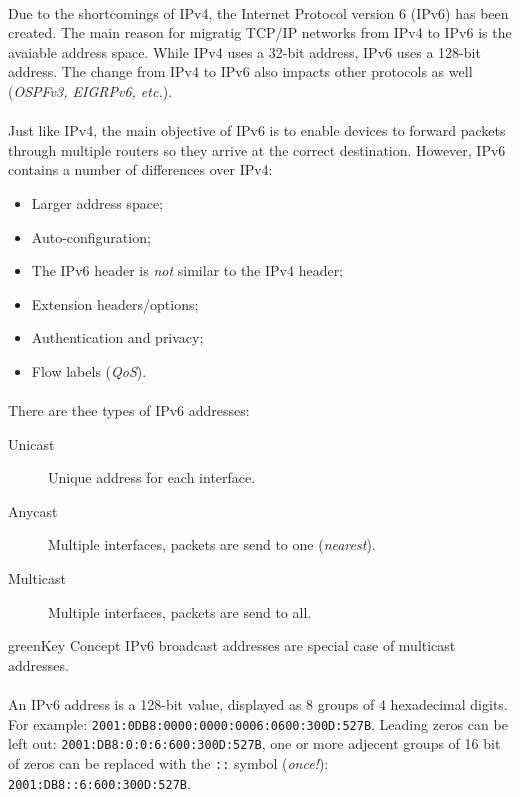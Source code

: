 \documentclass[10pt,landscape]{article}
\begin{document}
\begin{multicols}{3}
\paragraph{}
Due to the shortcomings of IPv4, the Internet Protocol version 6 (IPv6) has been created.
The main reason for migratig TCP/IP networks from IPv4 to IPv6 is the avaiable address space.
While IPv4 uses a 32-bit address, IPv6 uses a 128-bit address.
The change from IPv4 to IPv6 also impacts other protocols as well (\textit{OSPFv3, EIGRPv6, etc.}).
\paragraph{}
Just like IPv4, the main objective of IPv6 is to enable devices to forward packets through multiple routers so they arrive at the correct destination.
However, IPv6 contains a number of differences over IPv4:
\begin{itemize}
	\item Larger address space;
	\item Auto-configuration;
	\item The IPv6 header is \textit{not} similar to the IPv4 header;
	\item Extension headers/options;
	\item Authentication and privacy;
	\item Flow labels (\textit{QoS}).
\end{itemize}
\paragraph{}
There are thee types of IPv6 addresses:
\begin{description}
	\item[Unicast] Unique address for each interface.
	\item[Anycast] Multiple interfaces, packets are send to one (\textit{nearest}).
	\item[Multicast] Multiple interfaces, packets are send to all.
\end{description}
\begin{textbox}{green}{Key Concept}
	IPv6 broadcast addresses are special case of multicast addresses.
\end{textbox}
\paragraph{}
An IPv6 address is a 128-bit value, displayed as 8 groups of 4 hexadecimal digits.
For example: \verb!2001:0DB8:0000:0000:0006:0600:300D:527B!.
Leading zeros can be left out: \verb!2001:DB8:0:0:6:600:300D:527B!, one or more adjecent groups
of 16 bit of zeros can be replaced with the \verb!::! symbol (\textit{once!}): \verb!2001:DB8::6:600:300D:527B!.

\end{multicols}
\end{document}
